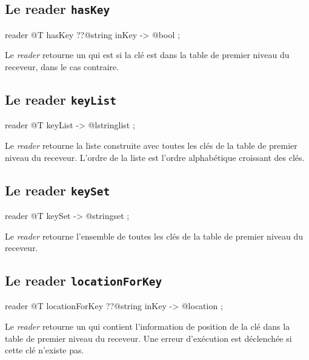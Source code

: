 \subsection{Le reader \texttt{hasKey}}

\begin{galgascode}
reader @T hasKey ??@string inKey -> @bool ;
\end{galgascode}


Le \emph{reader}  retourne un  qui est  si la clé  est dans la table de premier niveau du receveur,  dans le cas contraire.



\subsection{Le reader \texttt{keyList}}

\begin{galgascode}
reader @T keyList -> @lstringlist ;
\end{galgascode}


Le \emph{reader}  retourne la liste construite avec toutes les clés de la table de premier niveau du receveur. L'ordre de la liste est l'ordre alphabétique croissant des clés.



\subsection{Le reader \texttt{keySet}}

\begin{galgascode}
reader @T keySet -> @stringset ;
\end{galgascode}


Le \emph{reader}  retourne l'ensemble de toutes les clés de la table de premier niveau du receveur.





\subsection{Le reader \texttt{locationForKey}}

\begin{galgascode}
reader @T locationForKey ??@string inKey -> @location ;
\end{galgascode}


Le \emph{reader}  retourne un  qui contient l'information de position de la clé  dans la table de premier niveau du receveur. Une erreur d'exécution est déclenchée si cette clé n'existe pas.








